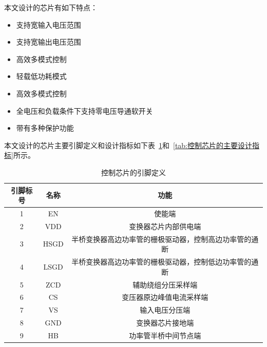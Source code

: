 本文设计的芯片有如下特点：
\begin{itemize}
    \setlength{\itemsep}{0pt}
    \setlength{\parsep}{0pt}
    \setlength{\parskip}{0pt}
    \item 支持宽输入电压范围
    \item 支持宽输出电压范围
    \item 高效多模式控制
    \item 轻载低功耗模式
    \item 高效多模式控制
    \item 全电压和负载条件下支持零电压导通软开关
    \item 带有多种保护功能
\end{itemize}

本文设计的芯片主要引脚定义和设计指标如下表~\ref{tab:控制芯片的引脚定义}和~\ref{tab:控制芯片的主要设计指标}所示。

\begin{table}[htbp]
    \caption{控制芯片的引脚定义}
    \label{tab:控制芯片的引脚定义}
    \centering
    \belowrulesep=0pt  %
    \aboverulesep=0pt  %
        \begin{tabular}{|c|c|c|}
            \toprule
            引脚标号 & 名称 & 功能  \\
            \midrule
            1 & EN   & 使能端                                              \\  \midrule
            2 & VDD  & 变换器芯片内部供电端                                 \\  \midrule
            3 & HSGD & 半桥变换器高边功率管的栅极驱动器，控制高边功率管的通断  \\\midrule  
            4 & LSGD & 半桥变换器高边功率管的栅极驱动器，控制低边功率管的通断  \\\midrule  
            5 & ZCD  & 辅助绕组分压采样端                                    \\  \midrule
            6 & CS   & 变压器原边峰值电流采样端                               \\ \midrule
            7 & VS   & 输入电压分压端                                        \\  \midrule
            8 & GND  & 变换器芯片接地端                                      \\  \midrule
            9 & HB   & 功率管半桥中间节点端                                   \\ 
              
            \bottomrule
        \end{tabular}
\end{table}

